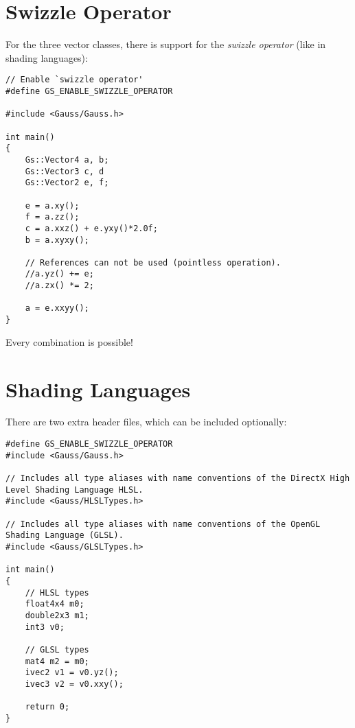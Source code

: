 \documentclass{article}
\begin{document}
\section*{Swizzle Operator}

For the three vector classes, there is support for the \textit{swizzle operator} (like in shading languages):
\begin{lstlisting}
// Enable `swizzle operator'
#define GS_ENABLE_SWIZZLE_OPERATOR

#include <Gauss/Gauss.h>

int main()
{
	Gs::Vector4 a, b;
	Gs::Vector3 c, d
	Gs::Vector2 e, f;
	
	e = a.xy();
	f = a.zz();
	c = a.xxz() + e.yxy()*2.0f;
	b = a.xyxy();
	
	// References can not be used (pointless operation).
	//a.yz() += e;
	//a.zx() *= 2;
	
	a = e.xxyy();
}
\end{lstlisting}
Every combination is possible!



\section*{Shading Languages}

There are two extra header files, which can be included optionally:
\begin{lstlisting}
#define GS_ENABLE_SWIZZLE_OPERATOR
#include <Gauss/Gauss.h>

// Includes all type aliases with name conventions of the DirectX High Level Shading Language HLSL.
#include <Gauss/HLSLTypes.h>

// Includes all type aliases with name conventions of the OpenGL Shading Language (GLSL).
#include <Gauss/GLSLTypes.h>

int main()
{
	// HLSL types
	float4x4 m0;
	double2x3 m1;
	int3 v0;
	
	// GLSL types
	mat4 m2 = m0;
	ivec2 v1 = v0.yz();
	ivec3 v2 = v0.xxy();
	
	return 0;
}
\end{lstlisting}


\end{document}
